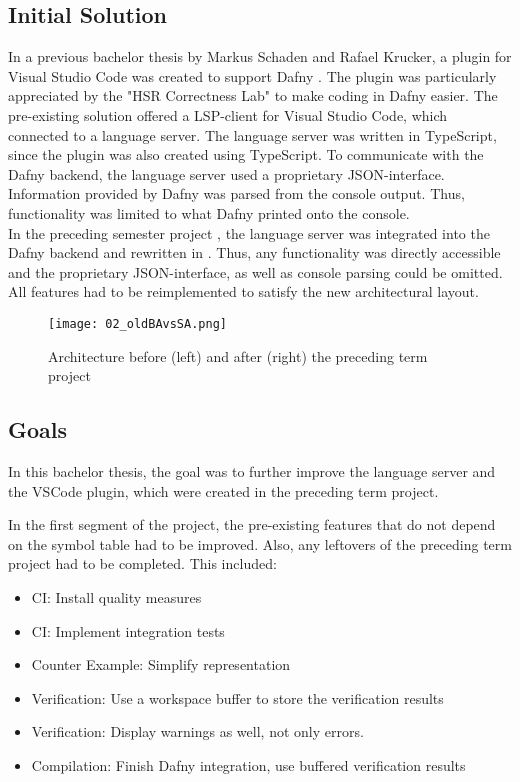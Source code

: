 \subsection{Initial Solution}
\label{section:introduction:initialsolution}
In a previous bachelor thesis by Markus Schaden and Rafael Krucker, a plugin for Visual Studio Code was created to support Dafny \cite{ba}.
The plugin was particularly appreciated by the "HSR Correctness Lab" \cite{correctnessLab} to make coding in Dafny easier.
The pre-existing solution offered a LSP-client for Visual Studio Code, which connected to a language server.
The language server was written in TypeScript, since the plugin was also created using TypeScript.
To communicate with the Dafny backend, the language server used a proprietary JSON-interface.
Information provided by Dafny was parsed from the console output.
Thus, functionality was limited to what Dafny printed onto the console.\\
In the preceding semester project \cite{sa}, the language server was integrated into the Dafny backend and rewritten in \Csharp.
Thus, any functionality was directly accessible and the proprietary JSON-interface, as well as console parsing could be omitted.
All features had to be reimplemented to satisfy the new architectural layout.

\begin{figure}[h]
    \centering
    \texttt{[image: 02\_oldBAvsSA.png]}
    \caption{Architecture before (left) and after (right) the preceding term project}
    \label{fig:oldBAvsSA}
\end{figure}


\subsection{Goals}
In this bachelor thesis, the goal was to further improve the language server and the VSCode plugin, which were created in the preceding term project.

In the first segment of the project, the pre-existing features that do not depend on the symbol table had to be improved.
Also, any leftovers of the preceding term project had to be completed.
This included:
\begin{itemize}
    \item CI: Install quality measures
    \item CI: Implement integration tests
    \item Counter Example: Simplify representation
    \item Verification: Use a workspace buffer to store the verification results
    \item Verification: Display warnings as well, not only errors.
    \item Compilation: Finish Dafny integration, use buffered verification results
\end{itemize}

